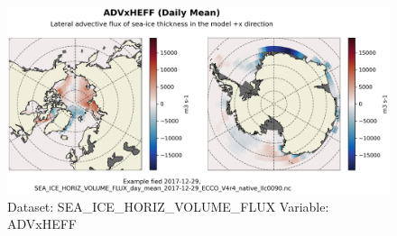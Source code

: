 \begin{figure}[H]
\centering
\includegraphics[scale=0.55]{../images/plots/native_plots/Sea-Ice_and_Snow_Horizontal_Volume_Fluxes/ADVxHEFF.png}
\caption{Dataset: SEA\_ICE\_HORIZ\_VOLUME\_FLUX Variable: ADVxHEFF}
\label{tab:table-SEA_ICE_HORIZ_VOLUME_FLUX_ADVxHEFF-Plot}
\end{figure}
\pagebreak
